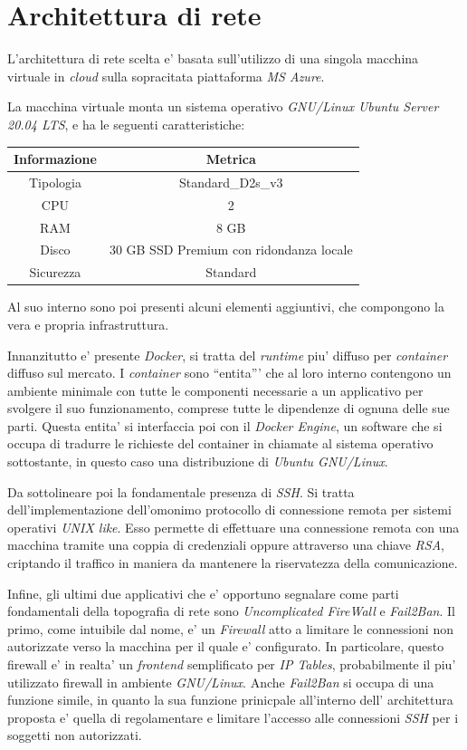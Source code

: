 \documentclass[a4paper]{report}
\newcommand{\quotes}[1]{``#1''}
\begin{document}
	\section{Architettura di rete}\label{architettura_di_rete}
		L'architettura di rete scelta e' basata sull'utilizzo di una singola macchina virtuale in \emph{cloud} sulla
		sopracitata piattaforma \emph{MS Azure}.

		La macchina virtuale monta un sistema operativo \emph{GNU/Linux Ubuntu Server 20.04 LTS}, e ha le seguenti
		caratteristiche:
		\begin{center}
			\begin{tabular}{c c}
				Informazione & Metrica \\
				\midrule
				Tipologia & Standard\_D2s\_v3 \\
				CPU & 2 \\
				RAM & 8 GB \\
				Disco & 30 GB SSD Premium con ridondanza locale \\
				Sicurezza & Standard \\
			\end{tabular}
		\end{center}

		Al suo interno sono poi presenti alcuni elementi aggiuntivi, che compongono la vera e propria infrastruttura.

		Innanzitutto e' presente \emph{Docker}, si tratta del \emph{runtime} piu' diffuso per \emph{container} diffuso
		sul mercato. I \emph{container} sono \quotes{entita'} che al loro interno contengono un ambiente minimale con
		tutte le componenti necessarie a un applicativo per svolgere il suo funzionamento, comprese tutte le dipendenze
		di ognuna delle sue parti. Questa entita' si interfaccia poi con il \emph{Docker Engine}, un software che si
		occupa di tradurre le richieste del container in chiamate al sistema operativo sottostante, in questo caso una
		distribuzione di \emph{Ubuntu GNU/Linux}.

		Da sottolineare poi la fondamentale presenza di \emph{SSH}\label{SSH}. Si tratta dell'implementazione
		dell'omonimo protocollo di connessione remota per sistemi operativi \emph{UNIX like}. Esso permette di
		effettuare una connessione remota con una macchina tramite una coppia di credenziali oppure attraverso una chiave
		\emph{RSA}, criptando il traffico in maniera da mantenere la riservatezza della comunicazione.

		Infine, gli ultimi due applicativi che e' opportuno segnalare come parti fondamentali della topografia di rete
		sono \emph{Uncomplicated FireWall} e \emph{Fail2Ban}. Il primo, come intuibile dal nome, e' un \emph{Firewall}
		atto a limitare le connessioni non autorizzate verso la macchina per il quale e' configurato. In particolare,
		questo firewall e' in realta' un \emph{frontend} semplificato per \emph{IP Tables}, probabilmente il piu'
		utilizzato firewall in ambiente \emph{GNU/Linux}.
		Anche \emph{Fail2Ban} si occupa di una funzione simile, in quanto la sua funzione prinicpale all'interno dell'
		architettura proposta e' quella di regolamentare e limitare l'accesso alle connessioni \emph{SSH} per i soggetti
		non autorizzati.
\end{document}
